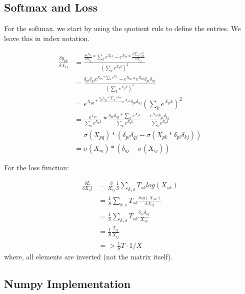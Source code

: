 \subsection{Softmax and Loss}
For the softmax, we start by using the quotient rule to define the entries. We leave this in index notation.

\begin{align}
    \frac{\delta y_{pq}}{\delta X_{ij}} &= \frac{
        \frac{\delta e^{X_{pq}}}{\delta X_{ij}} * \sum_k e^{X_{pk}} - e^{X_{pq}} * \frac{\delta \sum_k e^X_{pk}}{\delta X_{ij}}
    }{(\sum_k e^{X_pk})^2} \\
    &= \frac{\delta_{pi} \delta_{qj} e^{X_{pq} * \sum_k e^{X_{pk}}} - e^{X_{pq}} * e^{X_{pk}} \delta_{pi} \delta_{kj}}{{(\sum_k e^{X_pk})^2}} \\
    &= e^{X_{pq}* \frac{\delta_{pi} \delta_{qj}  * \sum_k e^{X_{pk}}} - e^{X_{pk}} \delta_{pi} \delta_{kj}}{{(\sum_k e^{X_pk})^2}} \\
    &= \frac{e^{X_{pq}}}{\sum_k e^{X_pk}} * \frac{\delta_{pi} \delta_{qj}  * \sum_k e^{X_{pk}}}{\sum_k e^{X_pk}} - \frac{e^{X_{pk}} \delta_{pi} \delta_{kj}}{{\sum_k e^{X_pk}}} \\
    &= \sigma(X_{pq}) * (\delta_{pi} \delta_{qj}  - \sigma(X_{pk} * \delta_{pi} \delta_{kj})) \\
    &= \sigma(X_{iq}) * (\delta_{qj}  - \sigma(X_{ij}))
\end{align}

For the loss function:

\begin{align}
    \frac{\delta L}{\delta X_ij} &= \frac{\delta}{X_{ij}} \frac{1}{S} \sum_{k, s} T_{sk} log(X_{sk}) \\
    &=\frac{1}{S} \sum_{k, s} T_{sk} \frac{log(X_{sk})}{\delta X_{ij}} \\
    &=\frac{1}{S} \sum_{k, s} T_{sk} \frac{\delta_{si} \delta_{kj}}{X_{sk}} \\
    &=\frac{1}{S} \frac{T_{ij}}{X_{ij}} \\
    &=>\frac{1}{S} T \cdot 1/X 
\end{align}
where, all elements are inverted (not the matrix itself).

\subsection{Numpy Implementation}

